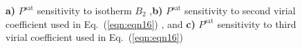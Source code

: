 \documentclass[5p,times]{elsarticle}
\begin{document}
\begin{figure}
\caption{
\textbf{a)} $P^{\mathrm{sat}}$ sensitivity to isotherm $B_2$
,\textbf{b)} $P^{\mathrm{sat}}$ sensitivity to second virial coefficient used in Eq.~(\ref{eqn:eqn16})
, and \textbf{c)} $P^{\mathrm{sat}}$ sensitivity to third virial coefficient used in Eq.~(\ref{eqn:eqn16})
}
\label{fig:B2-sensitivity}
\end{figure}



\end{document}
